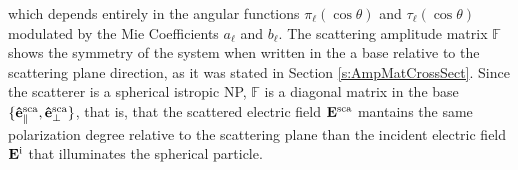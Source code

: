 %
which depends entirely in the angular functions $\pi_\ell(\cos\theta)$ and $\tau_\ell(\cos\theta)$ modulated by the Mie Coefficients $a_\ell$ and $b_\ell$. The scattering amplitude matrix $\mathbb{F}$ shows the symmetry of the system when written in the a base relative to the scattering plane direction, as it was stated in Section \ref{s:AmpMatCrossSect}. Since the scatterer is a spherical istropic NP,  $\mathbb{F}$ is a diagonal matrix in the base  $\{\vu{e}^\text{sca}_\parallel, \vu{e}^\text{sca}_\perp  \}$, that is, that the scattered electric field $\vb{E}^\text{sca}$ mantains the same polarization degree relative to the scattering plane than the incident electric field $\vb{E}^\text{i}$ that illuminates the spherical particle.

